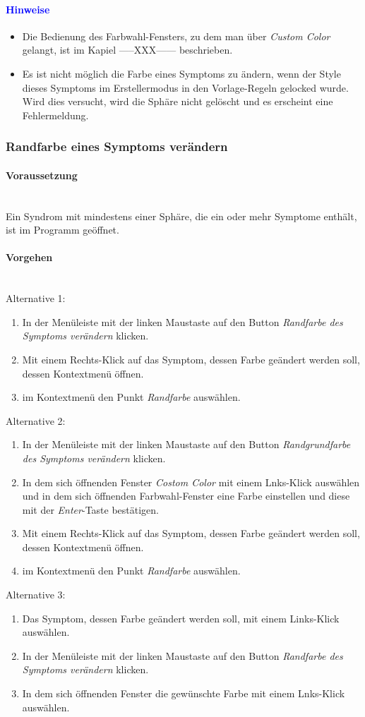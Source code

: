 \documentclass[enabledeprecatedfontcommands,fontsize=11pt,paper=a4,twoside]{scrartcl}
\newcommand*{\hint}{\paragraph{\textcolor{blue}{Hinweise}}}
\newcommand*{\condition}{\paragraph{Voraussetzung}$\;$ \vspace{0.2cm}\\}
\newcommand*{\actions}{\paragraph{Vorgehen} $\;$\vspace{0.2cm}\\}
\begin{document}
		\hint
		\begin{itemize}
			\item Die Bedienung des Farbwahl-Fensters, zu dem man über \textit{Custom Color} gelangt, ist im Kapiel -----XXX------ beschrieben.
			\item Es ist nicht möglich die Farbe eines Symptoms zu ändern, wenn der Style dieses Symptoms im Erstellermodus in den Vorlage-Regeln gelocked wurde. Wird dies versucht, wird die Sphäre nicht gelöscht und es erscheint eine Fehlermeldung.
	\end{itemize}	
	
			\newpage	
		\subsubsection{Randfarbe eines Symptoms verändern}
				\condition 	
		Ein Syndrom mit mindestens einer Sphäre, die ein oder mehr Symptome enthält, ist im Programm geöffnet. 
		\actions
		Alternative 1:
		\begin{enumerate}
			\item In der Menüleiste mit der linken Maustaste auf den Button \textit{Randfarbe des Symptoms verändern} klicken.
			\item Mit einem Rechts-Klick auf das Symptom, dessen Farbe geändert werden soll, dessen Kontextmenü öffnen.
			\item im Kontextmenü den Punkt \textit{Randfarbe} auswählen.
		\end{enumerate}
		Alternative 2:
		\begin{enumerate}
			\item In der Menüleiste mit der linken Maustaste auf den Button \textit{Randgrundfarbe des Symptoms verändern} klicken.
			\item In dem sich öffnenden Fenster \textit{Costom Color} mit einem Lnks-Klick auswählen und in dem sich öffnenden Farbwahl-Fenster eine Farbe einstellen und diese mit der \textit{Enter}-Taste bestätigen.
			 \item Mit einem Rechts-Klick auf das Symptom, dessen Farbe geändert werden soll, dessen Kontextmenü öffnen.
			\item im Kontextmenü den Punkt \textit{Randfarbe} auswählen.
		\end{enumerate}
		Alternative 3:
		\begin{enumerate}
			\item Das Symptom, dessen Farbe geändert werden soll, mit einem Links-Klick auswählen.
			\item In der Menüleiste mit der linken Maustaste auf den Button \textit{Randfarbe des Symptoms verändern} klicken.
			\item In dem sich öffnenden Fenster die gewünschte Farbe mit einem Lnks-Klick auswählen.
		\end{enumerate}
\end{document}
